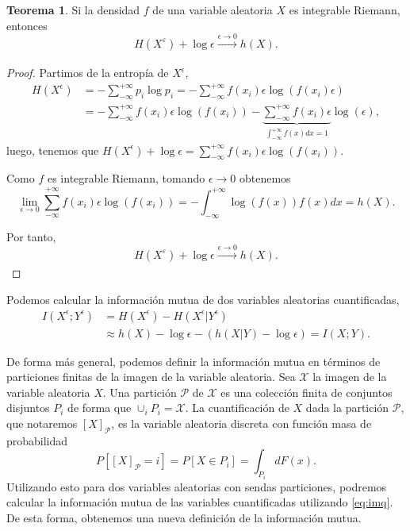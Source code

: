 \documentclass[10pt,a4paper]{article} %
\theoremstyle{definition}
\newtheorem{theorem}{Teorema}[section]
\begin{document}
\begin{theorem}
  Si la densidad $f$ de una variable aleatoria $X$ es integrable Riemann, entonces\[
H(X^{\varepsilon}) + \log \epsilon \xrightarrow[]{\epsilon \to 0}  h(X).
  \] 
\end{theorem}
\begin{proof}
  Partimos de la entropía de $X^{\epsilon}$,
  \begin{align*}
    H(X^{\epsilon}) &= - \sum_{-\infty}^{+\infty} p_i \log p_i = - \sum_{-\infty}^{+\infty}f(x_i)\epsilon \log\left ( f(x_i)\epsilon \right )\\
    &= -  \sum_{-\infty}^{+\infty}f(x_i)\epsilon \log\left ( f(x_i) \right ) - \underbrace{\sum_{-\infty}^{+\infty}f(x_i)\epsilon}_{\int_{-\infty}^{+\infty}f(x)dx=1} \log\left ( \epsilon \right ),
  \end{align*}
  luego, tenemos que $H(X^{\epsilon}) + \log \epsilon  = \sum_{-\infty}^{+\infty}f(x_i)\epsilon \log\left ( f(x_i) \right )$.

  Como $f$ es integrable Riemann, tomando $\epsilon \to 0$ obtenemos \[\lim_{\epsilon \to 0}\sum_{-\infty}^{+\infty}f(x_i)\epsilon \log\left ( f(x_i) \right )  = - \int_{-\infty}^{+\infty}\log\left( f(x)\right) f(x)dx = h(X).\]

  Por tanto,\[
H(X^{\varepsilon}) + \log \epsilon \xrightarrow[]{\epsilon \to 0}  h(X).
  \] 
\end{proof}

Podemos calcular la información mutua de dos variables aleatorias cuantificadas, 
\begin{align}\label{eq:imq}
  I(X^{\epsilon};Y^{\epsilon}) &= H(X^{\epsilon}) - H(X^{\epsilon}|Y^{\epsilon})\nonumber\\&\approx h(X) - \log\epsilon - (h(X|Y) - \log\epsilon) = I(X;Y).
\end{align}

De forma más general, podemos definir la información mutua en términos de particiones finitas de la imagen de la variable aleatoria. Sea $\mathcal{X}$ la imagen de la variable aleatoria $X$. Una partición $\mathcal{P}$ de $\mathcal{X}$ es una colección finita de conjuntos disjuntos $P_i$ de forma que $\cup_i P_i = \mathcal{X}$. La cuantificación de $X$ dada la partición $\mathcal{P}$, que notaremos $[X]_{\mathcal{P}}$, es la variable aleatoria discreta con función masa de probabilidad\[
P\left[[X]_{\mathcal{P}} = i\right ] = P [X\in P_i] = \int_{P_i}dF(x).
\]
Utilizando esto para dos variables aleatorias con sendas particiones, podremos calcular la información mutua de las variables cuantificadas utilizando \ref{eq:imq}. De esta forma, obtenemos una nueva definición de la información mutua.
\end{document}
